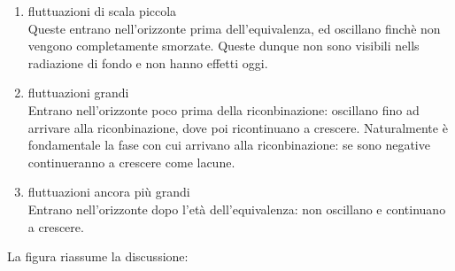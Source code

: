 \documentclass{report}
\begin{document}
\begin{enumerate}
    \item fluttuazioni di scala piccola \\
    Queste entrano nell'orizzonte prima dell'equivalenza, ed oscillano finchè non vengono completamente smorzate. Queste dunque non sono visibili nells radiazione di fondo e non hanno effetti oggi. 
    \item fluttuazioni grandi \\
    Entrano nell'orizzonte poco prima della riconbinazione: oscillano fino ad arrivare alla riconbinazione, dove poi ricontinuano a crescere. Naturalmente è fondamentale la fase con cui arrivano alla riconbinazione: se sono negative continueranno a crescere come lacune. 
    \item fluttuazioni ancora più grandi  \\
    Entrano nell'orizzonte dopo l'età dell'equivalenza: non oscillano e continuano a crescere. 
\end{enumerate}


La figura riassume la discussione:
\end{document}
